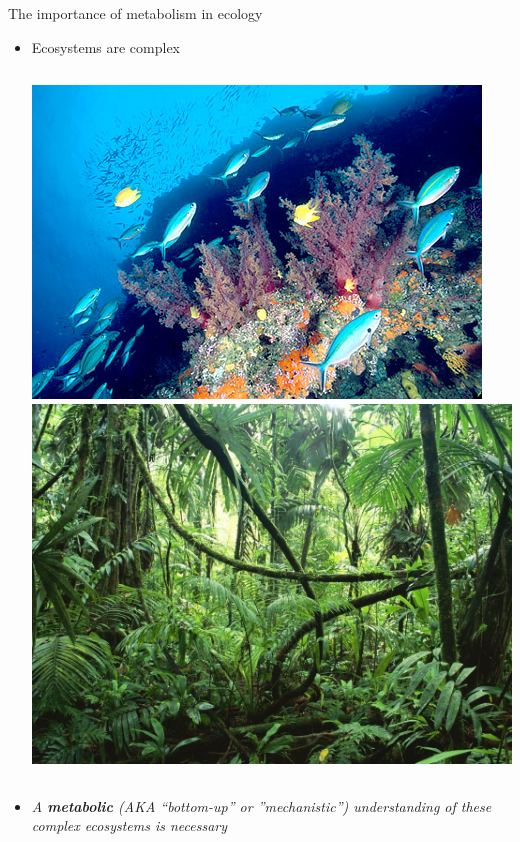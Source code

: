 \begin{frame}{The importance of metabolism in ecology}

\begin{itemize}[<+->]\setlength{\itemindent}{0em} \itemsep20pt
  \item Ecosystems are complex
	\vspace{5pt}
	\begin{columns}[c]
	    \includegraphics[width=\linewidth]{graphics/Reef.jpg}
	    \includegraphics[width=0.94\linewidth]{graphics/Rainforest.jpg}
	\end{columns}

	\item \textit{A {\bf metabolic} (AKA ``bottom-up'' or ''mechanistic'')  
	understanding of these complex ecosystems is necessary}
\end{itemize}
    
\end{frame}

